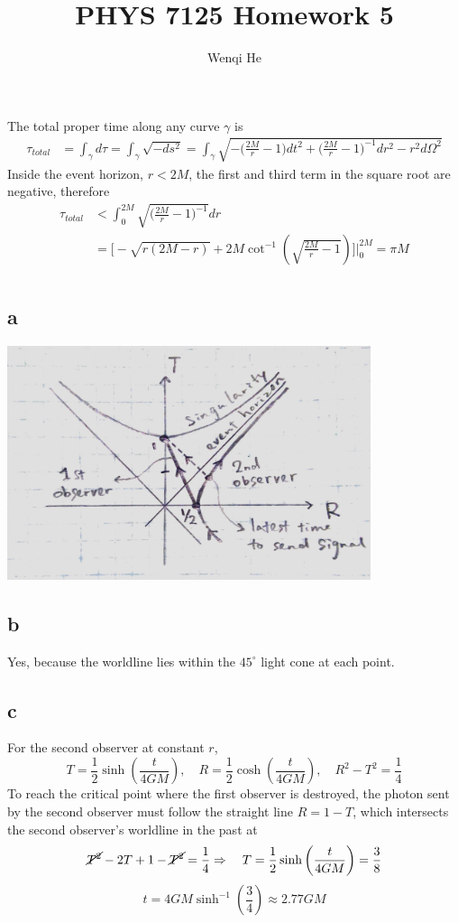 \documentclass{article}
\title{PHYS 7125 Homework 5}
\author{Wenqi He}
\begin{document}
\maketitle
\section{}
The total proper time along any curve $\gamma$ is
\begin{align*}
\tau_{total} &= \int_\gamma d\tau = \int_\gamma \sqrt{-ds^2} 
= \int_\gamma \sqrt{-\Big(\frac{2M}{r} - 1\Big)dt^2 + \Big(\frac{2M}{r} -1 \Big)^{-1} dr^2 - r^2d\Omega^2}
\end{align*}
Inside the event horizon, $r < 2M$, the first and third term in the square root are negative, therefore
\begin{align*}
\tau_{total} &< \int^{2M}_0 \sqrt{\Big(\frac{2M}{r} -1 \Big)^{-1}} dr \\
&= \Bigg[ -\sqrt{r(2M-r)} + 2M\cot^{-1}\left(\sqrt{\frac{2M}{r}-1} \right) \Bigg] \Bigg\rvert^{2M}_0 = \pi M
\end{align*}
\section{}
\subsection*{a}
\begin{center}
\includegraphics[width=0.8\textwidth]{diagram-1.jpg}
\end{center}
\subsection*{b}
Yes, because the worldline lies within the $45^\circ$ light cone at each point.
\subsection*{c}
For the second observer at constant $r$,
\[  T = \frac{1}{2}\sinh\left( \frac{t}{4GM} \right), \quad R = \frac{1}{2}\cosh\left( \frac{t}{4GM} \right)
	,\quad R^2 - T^2 = \frac{1}{4} \]
To reach the critical point where the first observer is destroyed, the photon sent by the second observer must follow the straight line $R  = 1 - T$, which intersects the second observer's worldline in the past at
\[ \cancel{T^2} - 2T + 1 - \cancel{T^2} = \frac{1}{4} \Rightarrow\quad T = \frac{1}{2}\sinh\left( \frac{t}{4GM} \right)  = \frac{3}{8}\]
\[ t = 4GM\sinh^{-1}\left(\frac{3}{4}\right) \approx 2.77GM \]
\end{document}
